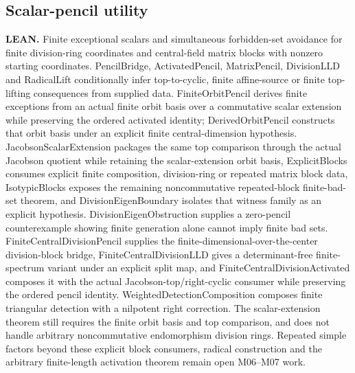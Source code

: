 \subsection{Scalar-pencil utility}\hypertarget{claim:scalar}{}\backmap
\textbf{LEAN.} Finite exceptional scalars and simultaneous forbidden-set avoidance for finite division-ring coordinates and central-field matrix blocks with nonzero starting coordinates. PencilBridge, ActivatedPencil, MatrixPencil, DivisionLLD and RadicalLift conditionally infer top-to-cyclic, finite affine-source or finite top-lifting consequences from supplied data. FiniteOrbitPencil derives finite exceptions from an actual finite orbit basis over a commutative scalar extension while preserving the ordered activated identity; DerivedOrbitPencil constructs that orbit basis under an explicit finite central-dimension hypothesis. JacobsonScalarExtension packages the same top comparison through the actual Jacobson quotient while retaining the scalar-extension orbit basis, ExplicitBlocks consumes explicit finite composition, division-ring or repeated matrix block data, IsotypicBlocks exposes the remaining noncommutative repeated-block finite-bad-set theorem, and DivisionEigenBoundary isolates that witness family as an explicit hypothesis. DivisionEigenObstruction supplies a zero-pencil counterexample showing finite generation alone cannot imply finite bad sets. FiniteCentralDivisionPencil supplies the finite-dimensional-over-the-center division-block bridge, FiniteCentralDivisionLLD gives a determinant-free finite-spectrum variant under an explicit split map, and FiniteCentralDivisionActivated composes it with the actual Jacobson-top/right-cyclic consumer while preserving the ordered pencil identity. WeightedDetectionComposition composes finite triangular detection with a nilpotent right correction. The scalar-extension theorem still requires the finite orbit basis and top comparison, and does not handle arbitrary noncommutative endomorphism division rings. Repeated simple factors beyond these explicit block consumers, radical construction and the arbitrary finite-length activation theorem remain open M06–M07 work.

